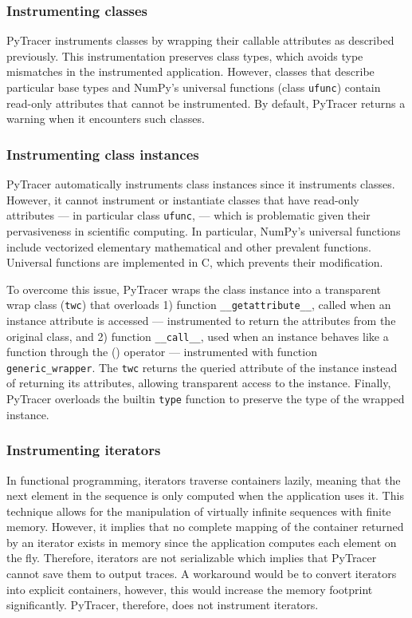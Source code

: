 \documentclass[10pt,journal,compsoc]{IEEEtran}
\newcommand{\pytracer}[0]{PyTracer\xspace}
\begin{document}
\subsubsection{Instrumenting classes}

\pytracer instruments classes by wrapping their callable attributes as described
previously. This instrumentation preserves class types, which avoids type
mismatches in the instrumented application. However, classes that describe
particular base types and NumPy's universal functions (class \texttt{ufunc})
contain read-only attributes that cannot be instrumented. By default, \pytracer
returns a warning when it encounters such classes. 

\subsubsection{Instrumenting class instances}

\pytracer automatically instruments class instances since it instruments
classes. However, it cannot instrument or instantiate classes that have
read-only attributes --- in particular class \texttt{ufunc}, --- which is
problematic given their pervasiveness in scientific computing. In particular,
NumPy's universal functions include vectorized elementary mathematical and other
prevalent functions. Universal functions are implemented in C, which prevents
their modification.

To overcome this issue, \pytracer wraps the class instance into a transparent
wrap class (\texttt{twc}) that overloads 1) function
\texttt{\_\_getattribute\_\_}, called when an instance attribute is accessed ---
instrumented to return the attributes from the original class, and 2) function
\texttt{\_\_call\_\_}, used when an instance behaves like a function through the
() operator --- instrumented with function \texttt{generic\_wrapper}. The
\texttt{twc} returns the queried attribute of the instance instead of returning
its attributes, allowing transparent access to the instance.  Finally, \pytracer
overloads the builtin \texttt{type} function to preserve the type of the wrapped
instance.

\subsubsection{Instrumenting iterators}

In functional programming, iterators traverse containers lazily, meaning that
the next element in the sequence is only computed when the application uses it.
This technique allows for the manipulation of virtually infinite sequences with
finite memory. However, it implies that no complete mapping of the container
returned by an iterator exists in memory since the application computes each
element on the fly. Therefore, iterators are not serializable which implies that
\pytracer cannot save them to output traces. A workaround would be to convert
iterators into explicit containers, however, this would increase the memory
footprint significantly. \pytracer, therefore, does not instrument
iterators.
\end{document}
